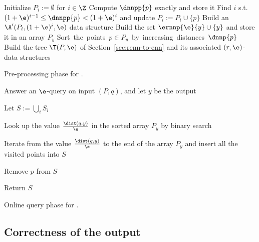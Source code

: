 \begin{algorithm}[!htb]
\LinesNumbered


  \BlankLine

  Initialize $P_i := \emptyset$ for $i\in \Z$\;
   {
    Compute $\dnnpp{p}$ exactly and store it\;
    Find $i$ s.t. $(1+\e)^{i-1}\leq \dnnpp{p}<(1+\e)^{i}$ and
    update $P_i := P_i \cup \{p\}$\;
  }
   {
    Build an $\A'(P_i, (1+\e)^{i}, \e)$ data structure\;
  }
   {
    Build the set $\ernnp{\e}{y}\cup\{y\}$ and store it in an array $P_y$ \;
    \mbox{Sort the points $p\in P_y$ by increasing distances $\dnnp{p}$} \;
  }
  Build the tree $\T(P,\e)$ of
  Section~\ref{sec:renn-to-enn} and its associated $(r,\e)$-\pleb data
  structures \;
\caption{\small Pre-processing phase for \rnn.}
  \label{alg:rnnpre}
\end{algorithm}
\begin{algorithm}[!htb]
\LinesNumbered


  \BlankLine

Answer an $\e$-\nn query on input $(P,q)$, and let  $y$ be the output \;
   { 
  }

  Let $S:=\bigcup_i S_i$ \; 


  Look up the value $\frac{\dist(q,y)}{\e}$ in the sorted array $P_y$ by binary search \;

  Iterate from the  value $\frac{\dist(q,y)}{\e}$ to the end of the array $P_y$ and insert all the visited points into $S$ \;


   {
     {
        Remove $p$ from $S$\;
    }
  }

  Return $S$ \;
\caption{\small Online query phase for \rnn.}
  \label{alg:rnnquery}
\end{algorithm}




\subsection{Correctness of the output}
\label{rnn_correctness}

